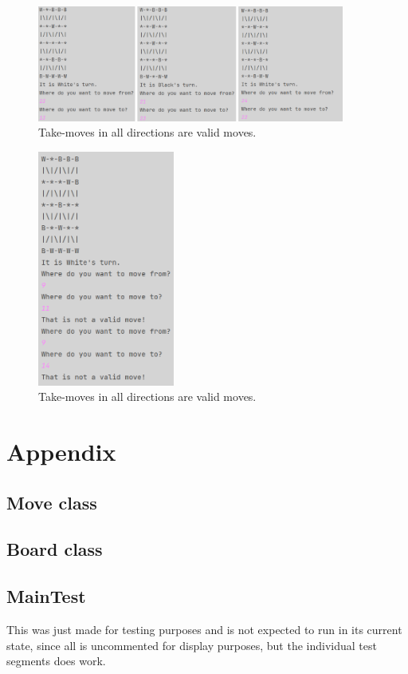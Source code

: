 \documentclass[12pt, a4paper]{article}
\begin{document}
\begin{figure}[h]
	\centering
	\caption*{Take-moves in all directions are valid moves.}
	\includegraphics[width=0.9\textwidth]{isLegalProf/3in1.png}	
\end{figure}

\begin{figure}[h]
	\centering
	\caption*{Take-moves in all directions are valid moves.}
	\includegraphics[width=0.4\textwidth]{isLegalProf/IkkeRykkeBagudEllerOutOfBounds.png}	
\end{figure}

\newpage

\section{Appendix}
\subsection{Move class}

\subsection{Board class}

\subsection{MainTest}
This was just made for testing purposes and is not expected to run in its current state, since all is uncommented for display purposes, but the individual test segments does work.

\end{document}
